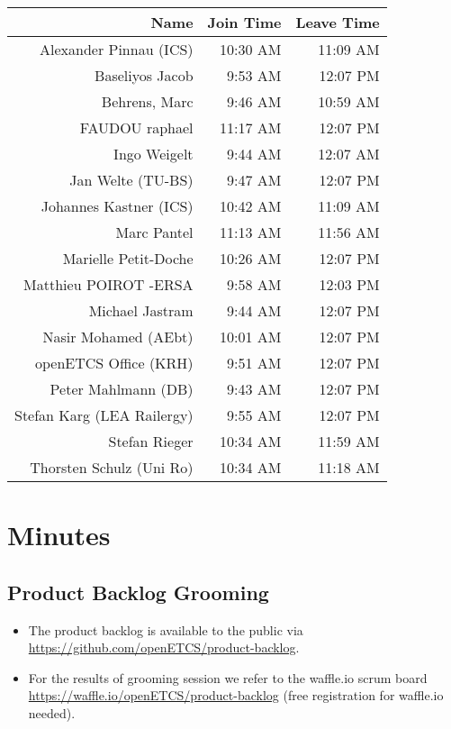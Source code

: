 \documentclass[a4paper, 11pt]{article}
\begin{document}
\begin{table}[htbp]
    \begin{tabular}{rrr}
    \toprule
    \textbf{Name} & \textbf{Join Time} & \textbf{Leave Time} \\
    \midrule
    Alexander Pinnau (ICS) & 10:30 AM & 11:09 AM \\
    Baseliyos Jacob & 9:53 AM & 12:07 PM \\
    Behrens, Marc & 9:46 AM & 10:59 AM \\
    FAUDOU raphael & 11:17 AM & 12:07 PM \\
    Ingo Weigelt & 9:44 AM & 12:07 AM \\
    Jan Welte (TU-BS) & 9:47 AM & 12:07 PM \\
    Johannes Kastner (ICS) & 10:42 AM & 11:09 AM \\
    Marc Pantel & 11:13 AM & 11:56 AM \\
    Marielle Petit-Doche & 10:26 AM & 12:07 PM \\
    Matthieu POIROT -ERSA & 9:58 AM & 12:03 PM \\
    Michael Jastram & 9:44 AM & 12:07 PM \\
    Nasir Mohamed (AEbt) & 10:01 AM & 12:07 PM \\
    openETCS  Office (KRH) & 9:51 AM & 12:07 PM \\
    Peter Mahlmann (DB) & 9:43 AM & 12:07 PM \\
    Stefan Karg (LEA Railergy) & 9:55 AM & 12:07 PM \\
    Stefan Rieger & 10:34 AM & 11:59 AM \\
    Thorsten Schulz (Uni Ro) & 10:34 AM & 11:18 AM \\
    \bottomrule
    \end{tabular}%
\end{table}%



\section{Minutes}

\subsection{Product Backlog Grooming}
\begin{itemize}
\item The product backlog is available to the public via 
\url{https://github.com/openETCS/product-backlog}. 
\item For the results of grooming session we refer to the waffle.io scrum board \url{https://waffle.io/openETCS/product-backlog} (free registration for waffle.io needed).
\end{itemize}
\end{document}
